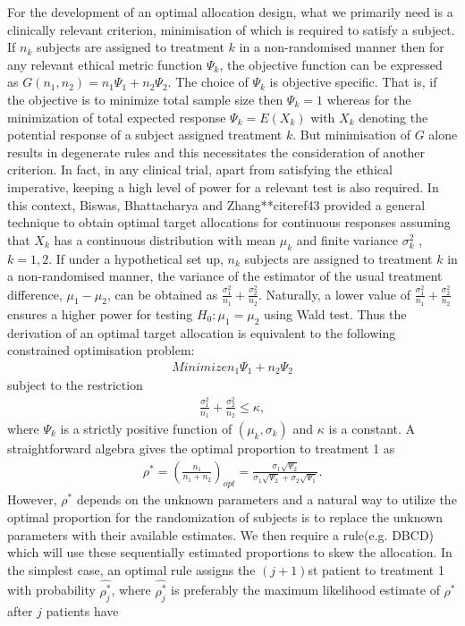 For the development of an optimal allocation design, what we primarily need is a clinically relevant criterion, minimisation of which is required to satisfy a subject. If  $n_k$ subjects are assigned to treatment $k$ in a non-randomised manner then  for any relevant ethical metric function  $\Psi_{k}$,  the objective function can be expressed as $G(n_1,n_2)=n_1
\Psi_{1}+ n_2\Psi_{2}$. The choice of $\Psi_{k}$ is objective specific. That is, if the objective is to minimize total sample size then $\Psi_{k}=1$ whereas for the minimization of total expected response $\Psi_{k}=E(X_k)$ with $X_k$ denoting the potential response of a subject assigned treatment $k$. But minimisation of $G$ alone results in degenerate rules and this
necessitates the consideration of  another criterion. In fact, in any
clinical trial, apart from satisfying the ethical imperative, keeping a high level of power for a relevant test is also required. In this context, Biswas, Bhattacharya and Zhang**citeref{43}  provided a general technique to obtain optimal target allocations for continuous responses assuming that $X_k$ has  a continuous distribution with mean $\mu_{k}$ and finite variance ${\sigma_{k}^{2}}$ , $k=1,2$.  If under a hypothetical set up,  $n_{k}$
subjects are assigned to treatment $k$ in a non-randomised manner, the
variance of the estimator of the usual treatment difference, $\mu_{1}-\mu_{2}$, can be obtained as $\frac{\sigma_{1}^{2}}{n_1}+\frac{\sigma_{2}^{2}}{n_2}$. Naturally, a lower value of $\frac{\sigma_{1}^{2}}{n_1}+\frac{\sigma_{2}^{2}}{n_2}$ ensures a higher power for testing $H_{0}: \mu_1=\mu_2$ using Wald test. Thus the
derivation of an optimal target allocation is equivalent to the
following constrained optimisation problem:
\begin{eqnarray*}
Minimize  n_{1}\Psi_{1}+n_{2}\Psi_{2}
 \end{eqnarray*}
subject to the restriction
\begin{eqnarray*}
\frac{\sigma_{1}^{2}}{n_{1}}+\frac{\sigma_{2}^{2}}{n_{2}}\leq \kappa,
\end{eqnarray*}
where $\Psi_{k}$ is a strictly positive function of
$(\mu_{k},\sigma_k)$ and $\kappa$ is a constant. A straightforward
algebra gives the optimal proportion to treatment 1 as
\begin{eqnarray*}
\rho^{*}=\left(\frac{n_1}{n_{1}+n_{2}}\right)_{opt}=\frac{\sigma_{1}\sqrt{\Psi_{2}}}{\sigma_{1}\sqrt{\Psi_{2}}+\sigma_{2}\sqrt{\Psi_{1}}}.
\end{eqnarray*}
However, $\rho^{*}$ depends on the unknown parameters and a natural way to utilize the optimal proportion for the randomization of subjects is to replace the unknown parameters with their available estimates. We then require a rule(e.g. DBCD) which will use these sequentially estimated proportions to skew the allocation. In the simplest case, an optimal rule assigns the $(j+1)$st patient to treatment 1 with probability $\hat{\rho_{j}^{*}}$, where $\hat{\rho^{*}_{j}}$ is preferably the maximum likelihood estimate of $\rho^{*}$ after $j$ patients have
